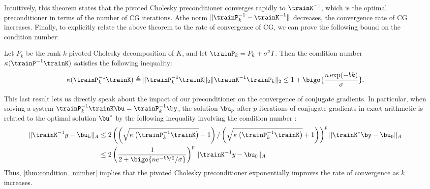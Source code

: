 %
Intuitively, this theorem states that the pivoted Cholesky preconditioner converges rapidly to $\trainK^{-1}$, which is the optimal preconditioner in terms of the number of CG iterations.
Athe norm $\Vert \trainP_{k}^{-1} - \trainK^{-1} \Vert$ decreases, the convergence rate of CG increases.
Finally, to explicitly relate the above theorem to the rate of convergence of CG, we can prove the following bound on the condition number:
%
\begin{theorem}
  \label{thm:condition_number}
  Let $P_{k}$ be the rank $k$ pivoted Cholesky decomposition of $K$, and let $\trainP_{k} = P_{k} + \sigma^{2}I$. Then the condition number $\kappa(\trainP^{-1}\trainK)$ satisfies the following inequality:
  \begin{equation}
    \kappa(\trainP_{k}^{-1}\trainK) \triangleq \Vert \trainP_{k}^{-1}\trainK \Vert_{2} \Vert \trainK^{-1}\trainP_{k} \Vert_{2} \leq 1 + \bigo{\frac{n\exp(-bk)}{\sigma}}.
  \end{equation}
\end{theorem}
%
This last result lets us directly speak about the impact of our preconditioner on the convergence of conjugate gradients.
In particular, when solving a system $\trainP_{k}^{-1}\trainK\bu = \trainP_{k}^{-1}\by$, the solution $\bu_{p}$ after $p$ iterations of conjugate gradients in exact arithmetic is related to the optimal solution $\bu^{*}$ by the following inequality involving the condition number :
%
\begin{equation}
  \begin{aligned}
  \Vert \trainK^{-1} y - \bu_{k} \Vert_{A}
  &\leq 2 \left( \left( {\sqrt{\kappa\left(\trainP_{k}^{-1}\trainK\right)} - 1} \right) / \left( {\sqrt{\kappa\left(\trainP_{k}^{-1}\trainK\right)} + 1} \right) \right)^{p}\Vert \trainK^{*}\by - \bu_{0} \Vert_{A}
  \\
  &\leq 2 \left(\frac{1}{2 + \bigo{n e^{-kb/2} / \sigma}}\right)^{p}\Vert \trainK^{-1} y - \bu_{0} \Vert_{A}
\end{aligned}
\end{equation}
%
Thus, \autoref{thm:condition_number} implies that the pivoted Cholesky preconditioner exponentially improves the rate of convergence as $k$ increases.
